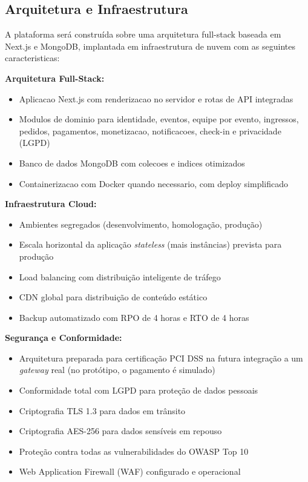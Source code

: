 \subsection{Arquitetura e Infraestrutura}

A plataforma será construída sobre uma arquitetura full-stack baseada em Next.js e MongoDB, implantada em infraestrutura de nuvem com as seguintes caracteristicas:

\textbf{Arquitetura Full-Stack:}
\begin{itemize}
    \item Aplicacao Next.js com renderizacao no servidor e rotas de API integradas
    \item Modulos de dominio para identidade, eventos, equipe por evento, ingressos, pedidos, pagamentos, monetizacao, notificacoes, check-in e privacidade (LGPD)
    \item Banco de dados MongoDB com colecoes e indices otimizados
    \item Containerizacao com Docker quando necessario, com deploy simplificado
\end{itemize}

\textbf{Infraestrutura Cloud:}
\begin{itemize}
    \item Ambientes segregados (desenvolvimento, homologação, produção)
    \item Escala horizontal da aplicação \textit{stateless} (mais instâncias) prevista para produção
    \item Load balancing com distribuição inteligente de tráfego
    \item CDN global para distribuição de conteúdo estático
    \item Backup automatizado com RPO de 4 horas e RTO de 4 horas
\end{itemize}

\textbf{Segurança e Conformidade:}
\begin{itemize}
    \item Arquitetura preparada para certificação PCI DSS na futura integração a um \textit{gateway} real (no protótipo, o pagamento é simulado)
    \item Conformidade total com LGPD para proteção de dados pessoais~\cite{LGPD:2018}
    \item Criptografia TLS 1.3 para dados em trânsito
    \item Criptografia AES-256 para dados sensíveis em repouso
    \item Proteção contra todas as vulnerabilidades do OWASP Top 10~\cite{OWASP:2021}
    \item Web Application Firewall (WAF) configurado e operacional
\end{itemize}

